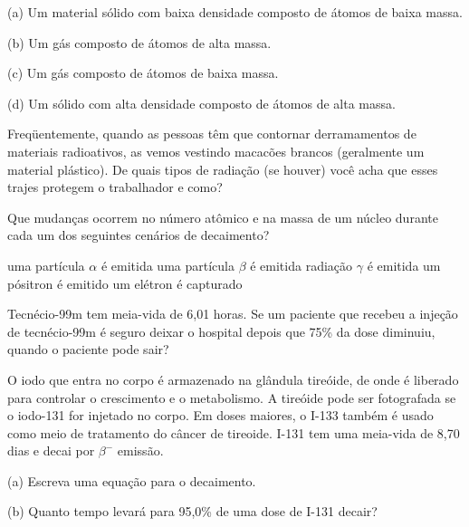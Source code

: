 \documentclass[11pt]{article}
\begin{document}
\begin{multicols}{2}
\begin{questions}
\begin{exercise}
(a) Um material sólido com baixa densidade composto de átomos de baixa massa.

(b) Um gás composto de átomos de alta massa.

(c) Um gás composto de átomos de baixa massa.

(d) Um sólido com alta densidade composto de átomos de alta massa.

 \blank[width=4.8\linewidth,linespread=1.0]{}
\end{exercise}
\begin{exercise}
Freqüentemente, quando as pessoas têm que contornar derramamentos de materiais radioativos, as vemos vestindo macacões brancos (geralmente um material plástico). De quais tipos de radiação (se houver) você acha que esses trajes protegem o trabalhador e como?

 \blank[width=6.8\linewidth,linespread=1.0]{}
\end{exercise}
\begin{exercise}
Que mudanças ocorrem no número atômico e na massa de um núcleo durante cada um dos seguintes cenários de decaimento?
\begin{choice}
\choice uma partícula \(\alpha\) é emitida
\choice uma partícula \(\beta\) é emitida
\choice radiação \(\gamma\) é emitida
\choice um pósitron é emitido
\choice um elétron é capturado
\end{choice}
\end{exercise}
\begin{exercise}
Tecnécio-99m tem meia-vida de 6,01 horas. Se um paciente que recebeu a injeção de tecnécio-99m é seguro deixar o hospital depois que 75\% da dose diminuiu, quando o paciente pode sair?
\end{exercise}
\begin{exercise}
O iodo que entra no corpo é armazenado na glândula tireóide, de onde é liberado para controlar o crescimento e o metabolismo. A tireóide pode ser fotografada se o iodo-131 for injetado no corpo. Em doses maiores, o I-133 também é usado como meio de tratamento do câncer de tireoide. I-131 tem uma meia-vida de 8,70 dias e decai por \(\beta^-\) emissão.

(a) Escreva uma equação para o decaimento.

(b) Quanto tempo levará para 95,0\% de uma dose de I-131 decair?
\end{exercise}
\end{questions}

\end{multicols}
\end{document}
